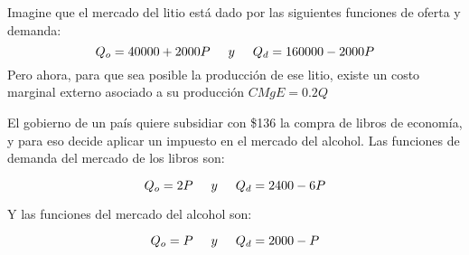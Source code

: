 \documentclass[addpoints,answers]{exam}
\begin{document}
\begin{questions}

\question Imagine que el mercado del litio está dado por las siguientes funciones de oferta y demanda:
\[Q_o = 40000 + 2000P \hspace{0.5cm}  y \hspace{0.5cm} Q_d = 160000 -2000P\]
Pero ahora, para que sea posible la producción de ese litio, existe un costo marginal externo asociado a su producción $CMgE = 0.2Q$

\question El gobierno de un país quiere subsidiar con \$136 la compra de libros de economía, y para eso decide aplicar un impuesto en el mercado del alcohol. Las funciones de demanda del mercado de los libros son:

\[Q_o = 2P \hspace{0.5cm}  y \hspace{0.5cm} Q_d = 2400 -6P\]

Y las funciones del mercado del alcohol son:

\[Q_o = P \hspace{0.5cm}  y \hspace{0.5cm} Q_d = 2000 - P\]
\end{questions}
\end{document}
